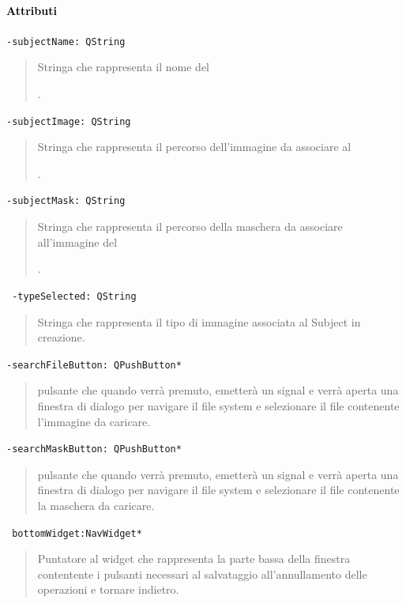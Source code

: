 \paragraph{\textcolor{black}{Attributi\\}}
\color{teal}\verb!-subjectName: QString!
\begin{quote}
\color{black}Stringa che rappresenta il nome del \subject{}.
\end{quote}
\color{teal}\verb!-subjectImage: QString!
\begin{quote}
\color{black}Stringa che rappresenta il percorso dell'immagine da associare al \subject{}.
\end{quote}
\color{teal}\verb!-subjectMask: QString !
\begin{quote}
\color{black}Stringa che rappresenta il percorso della maschera da associare all'immagine del \subject{}.
\end{quote}
\color{teal}\verb! -typeSelected: QString!
\color{black} 
\begin{quote}
Stringa che rappresenta il tipo di immagine associata al Subject\g{} in creazione.
\end{quote}
\color{teal}\verb!-searchFileButton: QPushButton* !
\begin{quote}
\color{black}pulsante che quando verrà premuto, emetterà un signal\g{} e verrà aperta una finestra di dialogo per navigare il file system e selezionare il file contenente l'immagine da caricare.
\end{quote}
\color{teal}\verb!-searchMaskButton: QPushButton* !
\begin{quote}
\color{black}pulsante che quando verrà premuto, emetterà un signal\g{} e verrà aperta una finestra di dialogo per navigare il file system e selezionare il file contenente la maschera da caricare.
\end{quote}
\color{teal}\verb! bottomWidget:NavWidget*!
\color{black} 
\begin{quote}
Puntatore al widget che rappresenta la parte bassa della finestra contentente i pulsanti necessari al salvataggio all'annullamento delle operazioni e tornare indietro.
\end{quote}
